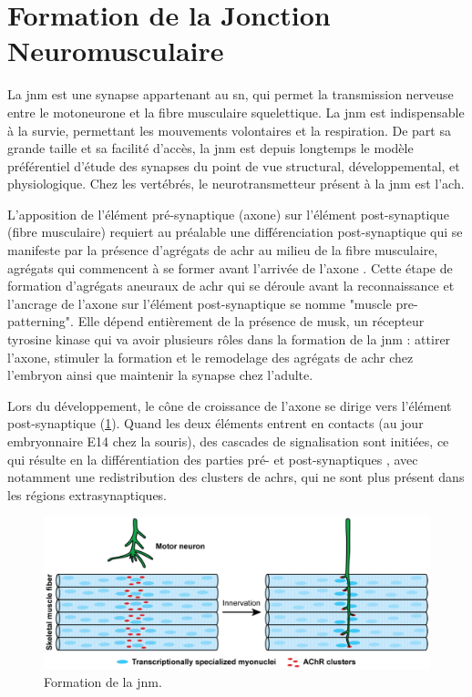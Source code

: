  
 
\section{Formation de la Jonction Neuromusculaire}
\label{sec:IntroSynapse}
	La \gls{jnm} est une synapse appartenant au \Acrfull{sn}, qui permet la transmission nerveuse entre le motoneurone et la fibre musculaire squelettique. La \gls{jnm} est indispensable à la survie, permettant les mouvements volontaires et la respiration. De part sa grande taille et sa facilité d'accès, la \gls{jnm} est depuis longtemps le modèle préférentiel d'étude des synapses du point de vue structural, développemental, et physiologique. Chez les vertébrés, le neurotransmetteur présent à la \gls{jnm} est l'\gls{ach}. 

	L'apposition de l'élément pré-synaptique (axone) sur l'élément post-synaptique (fibre musculaire) requiert au préalable une différenciation post-synaptique qui se manifeste par la présence d'agrégats de \gls{achr} au milieu de la fibre musculaire, agrégats qui commencent à se former avant l'arrivée de l'axone \cite{Wu2010a, Gordon2012}. Cette étape de formation d'agrégats aneuraux de \gls{achr} qui se déroule avant la reconnaissance et l'ancrage de l'axone sur l'élément post-synaptique se nomme "muscle pre-patterning". Elle dépend entièrement de la présence de \acrshort{musk}, un récepteur tyrosine kinase qui va avoir plusieurs rôles dans la formation de la \gls{jnm} : attirer l'axone, stimuler la formation et le remodelage des agrégats de \gls{achr} chez l'embryon ainsi que maintenir la synapse chez l'adulte.

	Lors du développement, le cône de croissance de l'axone se dirige vers l'élément post-synaptique (\cref{fig:FormaJNM}). Quand les deux éléments entrent en contacts (au jour embryonnaire E14 chez la souris), des cascades de signalisation sont initiées, ce qui résulte en la différentiation des parties pré- et post-synaptiques \cite{Sanes1999}, avec notamment une redistribution des clusters de \glspl{achr}, qui ne sont plus présent dans les régions extrasynaptiques.

	\begin{figure}[h]
		\includegraphics[width=\textwidth]{./Images/formation_jnm.png}
		\caption{Formation de la \gls{jnm}.} 
		\label{fig:FormaJNM}
	\end{figure}
	
